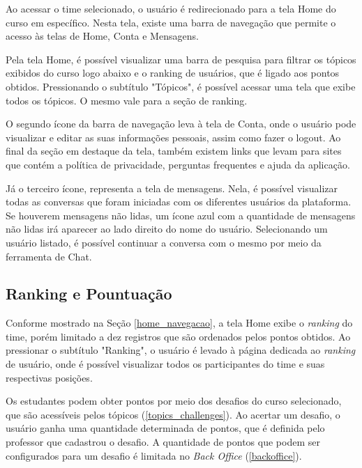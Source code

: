 Ao acessar o time selecionado, o usuário é redirecionado para a tela Home do curso em específico. Nesta tela, existe uma barra de navegação que permite o acesso às telas de Home, Conta e Mensagens.


Pela tela Home, é possível visualizar uma barra de pesquisa para filtrar os tópicos exibidos do curso logo abaixo e o ranking de usuários, que é ligado aos pontos obtidos. Pressionando o subtítulo "Tópicos", é possível acessar uma tela que exibe todos os tópicos. O mesmo vale para a seção de ranking.

O segundo ícone da barra de navegação leva à tela de Conta, onde o usuário pode visualizar e editar as suas informações pessoais, assim como fazer o logout. Ao final da seção em destaque da tela, também existem links que levam para sites que contém a política de privacidade, perguntas frequentes e ajuda da aplicação.

Já o terceiro ícone, representa a tela de mensagens. Nela, é possível visualizar todas as conversas que foram iniciadas com os diferentes usuários da plataforma. Se houverem mensagens não lidas, um ícone azul com a quantidade de mensagens não lidas irá aparecer ao lado direito do nome do usuário. Selecionando um usuário listado, é possível continuar a conversa com o mesmo por meio da ferramenta de Chat.

\subsection{Ranking e Pountuação}
\label{ranking}

Conforme mostrado na Seção \ref{home_navegacao}, a tela Home exibe o \textit{ranking} do time, porém limitado a dez registros que são ordenados pelos pontos obtidos. Ao pressionar o subtítulo "Ranking", o usuário é levado à página dedicada ao \textit{ranking} de usuário, onde é possível visualizar todos os participantes do time e suas respectivas posições.


Os estudantes podem obter pontos por meio dos desafios do curso selecionado, que são acessíveis pelos tópicos (\ref{topics_challenges}). Ao acertar um desafio, o usuário ganha uma quantidade determinada de pontos, que é definida pelo professor que cadastrou o desafio. A quantidade de pontos que podem ser configurados para um desafio é limitada no \textit{Back Office} (\ref{backoffice}).

